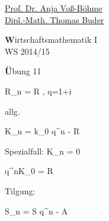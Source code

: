 \documentclass[12pt,a4paper]{scrreprt}
\begin{document}
 
\begin{flushleft}
\href{mailto:anja.voss-boehme@htw-dresden.de}{Prof. Dr. Anja Voß-Böhme} \\
\href{mailto:buder@htw-dresden.de}{Dipl.-Math. Thomas Buder}
\end{flushleft}

\begin{center}{\large\textbf Wirtschaftsmathematik I} \\ WS 2014/15 \end{center}

\begin{center}{\large\textbf Übung 11 } 
\end{center}


\bigskip


R_n = R , q=1+i

allg.

K_n = k_0 q^n - R 

Spezialfall: K_n = 0

q^nK_0 = R 

Tilgung:

S_n = S q^n - A 
\end{document}
